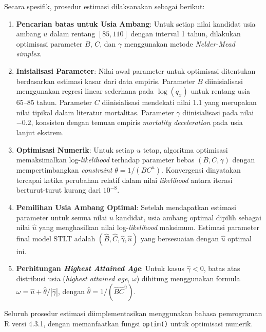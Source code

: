 Secara spesifik, prosedur estimasi dilaksanakan sebagai berikut:

\begin{enumerate}
    \item \textbf{Pencarian batas untuk Usia Ambang}: Untuk setiap nilai kandidat usia ambang $u$ dalam rentang $[85, 110]$ dengan interval 1 tahun, dilakukan optimisasi parameter $B$, $C$, dan $\gamma$ menggunakan metode \textit{Nelder-Mead simplex}.
    
    \item \textbf{Inisialisasi Parameter}: Nilai awal parameter untuk optimisasi ditentukan berdasarkan estimasi kasar dari data empiris. Parameter $B$ diinisialisasi menggunakan regresi linear sederhana pada $\log(q_x)$ untuk rentang usia 65--85 tahun. Parameter $C$ diinisialisasi mendekati nilai 1.1 yang merupakan nilai tipikal dalam literatur mortalitas. Parameter $\gamma$ diinisialisasi pada nilai $-0.2$, konsisten dengan temuan empiris \textit{mortality deceleration} pada usia lanjut ekstrem.
    
    \item \textbf{Optimisasi Numerik}: Untuk setiap $u$ tetap, algoritma optimisasi memaksimalkan log-\textit{likelihood} terhadap parameter bebas $(B, C, \gamma)$ dengan mempertimbangkan \textit{constraint} $\theta = 1/(BC^u)$. Konvergensi dinyatakan tercapai ketika perubahan relatif dalam nilai \textit{likelihood} antara iterasi berturut-turut kurang dari $10^{-8}$.
    
    \item \textbf{Pemilihan Usia Ambang Optimal}: Setelah mendapatkan estimasi parameter untuk semua nilai $u$ kandidat, usia ambang optimal dipilih sebagai nilai $\hat{u}$ yang menghasilkan nilai log-\textit{likelihood} maksimum. Estimasi parameter final model STLT adalah $(\hat{B}, \hat{C}, \hat{\gamma}, \hat{u})$ yang bersesuaian dengan $\hat{u}$ optimal ini.
    
    \item \textbf{Perhitungan \textit{Highest Attained Age}}: Untuk kasus $\hat{\gamma} < 0$, batas atas distribusi usia (\textit{highest attained age}, $\omega$) dihitung menggunakan formula $\omega = \hat{u} + \hat{\theta}/|\hat{\gamma}|$, dengan $\hat{\theta} = 1/(\hat{B}\hat{C}^{\hat{u}})$.
\end{enumerate}

Seluruh prosedur estimasi diimplementasikan menggunakan bahasa pemrograman R versi 4.3.1, dengan memanfaatkan fungsi \texttt{optim()} untuk optimisasi numerik.


